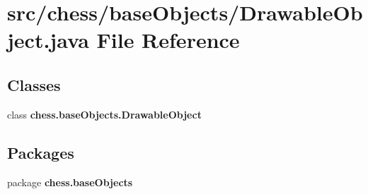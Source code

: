 \section{src/chess/base\+Objects/\+Drawable\+Object.java File Reference}
\label{_drawable_object_8java}
\subsection*{Classes}
\begin{DoxyCompactItemize}
\item 
class {\bf chess.\+base\+Objects.\+Drawable\+Object}
\end{DoxyCompactItemize}
\subsection*{Packages}
\begin{DoxyCompactItemize}
\item 
package {\bf chess.\+base\+Objects}
\end{DoxyCompactItemize}
